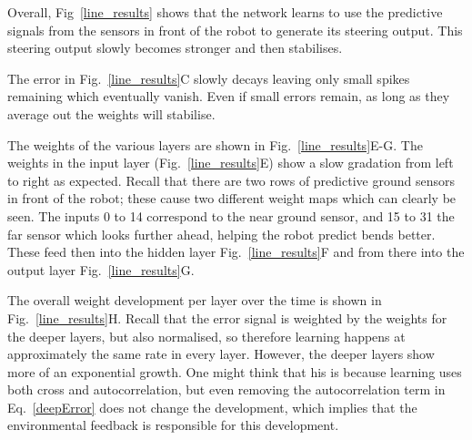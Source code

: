 \documentclass{aamas2018}
\begin{document}
Overall, Fig~\ref{line_results} shows that the network learns to use
the predictive signals from the sensors in front of the robot to
generate its steering output. This steering output slowly becomes
stronger and then stabilises.

The error in Fig.~\ref{line_results}C slowly decays
leaving only small spikes remaining which eventually vanish. Even
if small errors remain, as long as they average out the weights
will stabilise.

The weights of the various layers are shown in
Fig.~\ref{line_results}E-G. The weights in the input layer
(Fig.~\ref{line_results}E) show a slow gradation from left to right as
expected. Recall that there are two rows of predictive ground
sensors in front of the robot; these cause two different weight maps
which can clearly be seen. The inputs 0 to 14 correspond to the near
ground sensor, and 15 to 31 the far sensor which looks further ahead, 
helping the robot predict bends better. These feed then into the 
hidden layer Fig.~\ref{line_results}F
and from there into the output layer Fig.~\ref{line_results}G.

The overall weight development per layer over the time is shown in
Fig.~\ref{line_results}H. Recall that the error signal is weighted by
the weights for the deeper layers, but also normalised, so therefore
learning happens at approximately the same rate in every
layer. However, the deeper layers show more of an exponential
growth. One might think that his is because learning uses both
cross and autocorrelation, but even removing the autocorrelation
term in Eq.~\ref{deepError} does not change the development, which implies
that the environmental feedback is responsible for this development.
\end{document}
